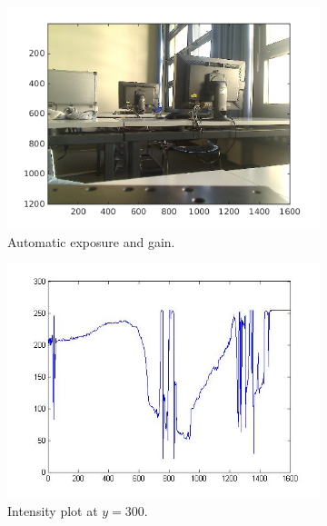 \documentclass[a4paper, 12pt]{paper}
\begin{document}
\begin{figure}[h]
    \centering
    \begin{subfigure}[p]{0.40\textwidth}
        \includegraphics[width=\textwidth]{img/auto}
        \caption{Automatic exposure and gain.}
\label{fig:auto}
    \end{subfigure}
    \begin{subfigure}[p]{0.40\textwidth}
        \includegraphics[width=\textwidth]{img/auto_int}
        \caption{Intensity plot at $y=300$.}
    \end{subfigure}
    \begin{subfigure}[p]{0.40\textwidth}

\end{subfigure}
\end{figure}
\end{document}
